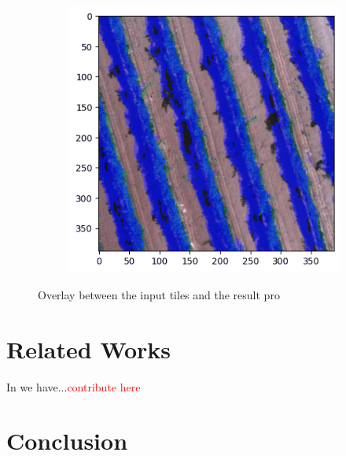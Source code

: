 \documentclass[comsoc,final]{IEEEtran}
\newcommand{\todo}[1]{\textcolor{red}{#1}}
\begin{document}
\begin{figure}
\begin{subfigure}[b]{0.3\columnwidth}
         \caption{}
     \end{subfigure}%
%       
     \begin{subfigure}[b]{0.3\columnwidth}
         \centering
         \includegraphics[width=\columnwidth]{VITE2INF}
         \caption{}
     \end{subfigure}%
% 

     \caption{Overlay between the input tiles and the result pro}
\end{figure}


\section{Related Works}\label{sec:related}

In \nocite{*} we have...\todo{contribute here}


\section{Conclusion}\label{sec:conclusion}
\end{document}
